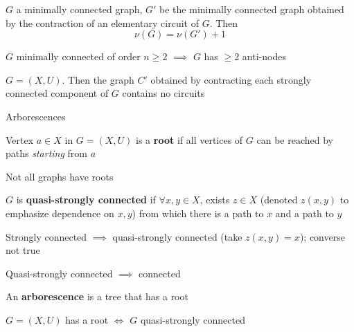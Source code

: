 \documentclass[aspectratio=43]{beamer}
\begin{document}
\begin{frame} 
\begin{theorem}
$G$ a minimally connected graph, $G'$ be the minimally connected graph obtained by the contraction of an elementary circuit of $G$.	Then
\[
\nu(G)=\nu(G')+1
\]
\end{theorem}
\vfill
\begin{theorem}
$G$ minimally connected of order $n\geq 2$ $\implies$ $G$ has $\geq 2$ anti-nodes
\end{theorem}
\vfill
\begin{theorem}
$G=(X,U)$. Then the graph $C'$ obtained by contracting each strongly connected component of $G$ contains no circuits
\end{theorem}
\end{frame}


\begin{frame}{Arborescences}
\begin{definition}[Root]
Vertex $a\in X$ in $G=(X,U)$ is a \textbf{root} if all vertices of $G$ can be reached by paths \emph{starting} from $a$
\end{definition}
Not all graphs have roots
\vfill
\begin{definition}
$G$ is \textbf{quasi-strongly connected} if $\forall x,y\in X$, exists $z\in X$ (denoted $z(x,y)$ to emphasize dependence on $x,y$) from which there is a path to $x$ and a path to $y$
\end{definition}
Strongly connected $\implies$ quasi-strongly connected (take $z(x,y)=x$); converse not true

Quasi-strongly connected $\implies$ connected
\vfill
\begin{definition}[Arborescence]
An \textbf{arborescence} is a tree that has a root
\end{definition}
\vfill
\begin{lemma}
$G=(X,U)$ has a root $\iff$ $G$ quasi-strongly connected
\end{lemma}
\end{frame}
\end{document}
